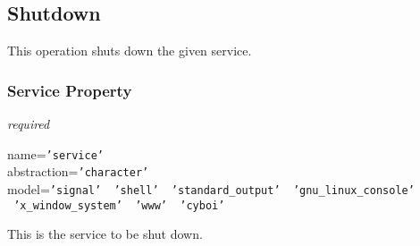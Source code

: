%
%
%
%
%
%

\subsection{Shutdown}
\label{shutdown_heading}

This operation shuts down the given service.

\subsubsection{Service Property}

\emph{required}

name=\texttt{'service'}\\
abstraction=\texttt{'character'}\\
model=\texttt{'signal' \vline\ 'shell' \vline\ 'standard\_output'
    \vline\ 'gnu\_linux\_console' \vline\ 'x\_window\_system' \vline\ 'www' \vline\ 'cyboi'}

This is the service to be shut down.
